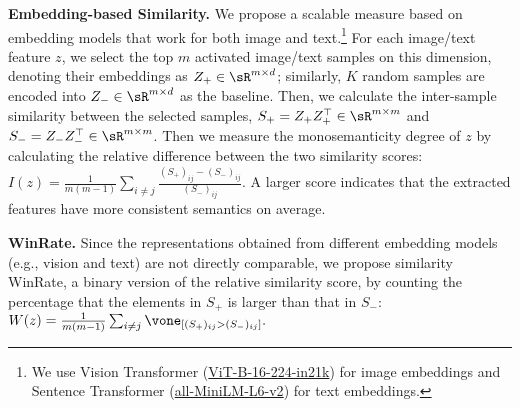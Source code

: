 \textbf{Embedding-based Similarity.} 
We propose a scalable measure based on embedding models that work for both image and text.\footnote{We use Vision Transformer (\href{https://huggingface.co/google/vit-base-patch16-224-in21k}{ViT-B-16-224-in21k}) for image embeddings and Sentence Transformer (\href{https://huggingface.co/sentence-transformers/all-MiniLM-L6-v2}{all-MiniLM-L6-v2}) for text embeddings.} 
For each image/text feature $z$, we select the top $m$ activated image/text samples on this dimension, denoting their embeddings as $Z_+\in\sR^{m\times d}$; similarly, $K$ random samples are encoded into $Z_-\in\sR^{m\times d}$ as the baseline. Then, we calculate the inter-sample similarity between the selected samples, $S_+=Z_+Z_+^\top\in\sR^{m\times m}$ and $S_-=Z_-Z_-^\top\in\sR^{m\times m}$. Then we measure the monosemanticity degree of $z$ by calculating the relative difference between the two similarity scores: 
$I(z)=\frac{1}{m(m-1)}\sum_{i\neq j}\frac{(S_+)_{ij}-(S_-)_{ij}}{(S_-)_{ij}}. $
A larger score indicates that the extracted features have more consistent semantics on average.

\textbf{WinRate.}  
Since the representations obtained from different embedding models (e.g., vision and text) are not directly comparable, we propose similarity WinRate, a binary version of the relative similarity score, by counting the percentage that the elements in $S_+$ is larger than that in $S_-$:
$W(z)=\frac{1}{m(m-1)}\sum_{i\neq j}\vone_{[(S_+)_{ij}>(S_-)_{ij}]}.$ 

